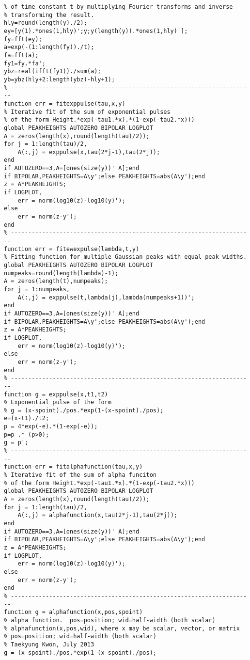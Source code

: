 \begin{lstlisting}
% of time constant t by multiplying Fourier transforms and inverse
% transforming the result.
hly=round(length(y)./2);
ey=[y(1).*ones(1,hly)';y;y(length(y)).*ones(1,hly)'];
fy=fft(ey);
a=exp(-(1:length(fy))./t);
fa=fft(a);
fy1=fy.*fa';
ybz=real(ifft(fy1))./sum(a);
yb=ybz(hly+2:length(ybz)-hly+1);
% ----------------------------------------------------------------------
function err = fitexppulse(tau,x,y)
% Iterative fit of the sum of exponential pulses
% of the form Height.*exp(-tau1.*x).*(1-exp(-tau2.*x)))
global PEAKHEIGHTS AUTOZERO BIPOLAR LOGPLOT
A = zeros(length(x),round(length(tau)/2));
for j = 1:length(tau)/2,
    A(:,j) = exppulse(x,tau(2*j-1),tau(2*j));
end
if AUTOZERO==3,A=[ones(size(y))' A];end
if BIPOLAR,PEAKHEIGHTS=A\y';else PEAKHEIGHTS=abs(A\y');end
z = A*PEAKHEIGHTS;
if LOGPLOT,
    err = norm(log10(z)-log10(y)');
else
    err = norm(z-y');
end
% ----------------------------------------------------------------------
function err = fitewexpulse(lambda,t,y)
% Fitting function for multiple Gaussian peaks with equal peak widths.
global PEAKHEIGHTS AUTOZERO BIPOLAR LOGPLOT
numpeaks=round(length(lambda)-1);
A = zeros(length(t),numpeaks);
for j = 1:numpeaks,
    A(:,j) = exppulse(t,lambda(j),lambda(numpeaks+1))';
end
if AUTOZERO==3,A=[ones(size(y))' A];end
if BIPOLAR,PEAKHEIGHTS=A\y';else PEAKHEIGHTS=abs(A\y');end
z = A*PEAKHEIGHTS;
if LOGPLOT,
    err = norm(log10(z)-log10(y)');
else
    err = norm(z-y');
end
% ----------------------------------------------------------------------
function g = exppulse(x,t1,t2)
% Exponential pulse of the form 
% g = (x-spoint)./pos.*exp(1-(x-spoint)./pos);
e=(x-t1)./t2;
p = 4*exp(-e).*(1-exp(-e));
p=p .* (p>0);
g = p';
% ----------------------------------------------------------------------
function err = fitalphafunction(tau,x,y)
% Iterative fit of the sum of alpha funciton
% of the form Height.*exp(-tau1.*x).*(1-exp(-tau2.*x)))
global PEAKHEIGHTS AUTOZERO BIPOLAR LOGPLOT
A = zeros(length(x),round(length(tau)/2));
for j = 1:length(tau)/2,
    A(:,j) = alphafunction(x,tau(2*j-1),tau(2*j));
end
if AUTOZERO==3,A=[ones(size(y))' A];end
if BIPOLAR,PEAKHEIGHTS=A\y';else PEAKHEIGHTS=abs(A\y');end
z = A*PEAKHEIGHTS;
if LOGPLOT,
    err = norm(log10(z)-log10(y)');
else
    err = norm(z-y');
end
% ----------------------------------------------------------------------
function g = alphafunction(x,pos,spoint)
% alpha function.  pos=position; wid=half-width (both scalar)
% alphafunction(x,pos,wid), where x may be scalar, vector, or matrix
% pos=position; wid=half-width (both scalar)
% Taekyung Kwon, July 2013  
g = (x-spoint)./pos.*exp(1-(x-spoint)./pos);

\end{lstlisting}
